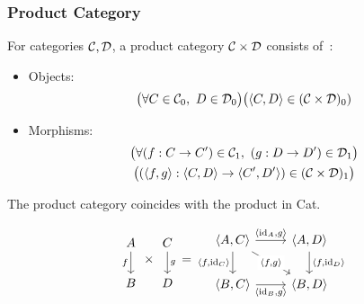 \subsubsection{Product Category}
\begin{definition}
  For categories $\mathcal{C},\mathcal{D}$, a product category $\mathcal{C}\times \mathcal{D}$ consists
  of~\parencite[p.~16]{awodey:category_theory}:

  \begin{itemize}
    \item Objects:
      \[\big(\forall C \in \mathcal{C}_0,\ D \in \mathcal{D}_0\big)
        \big(\langle C, D\rangle\in (\mathcal{C}\times \mathcal{D})_0)\]
    \item Morphisms:
      \[
        \begin{gathered}
          \big(\forall (f: C \to C')\in \mathcal{C}_1,\ (g:D \to D')\in \mathcal{D}_1\big)\\
          \big((\langle f,g\rangle : \langle C,D\rangle \to \langle C', D'\rangle)\in (\mathcal{C}\times \mathcal{D})_1\big)
        \end{gathered}
      \]
  \end{itemize}
\end{definition}

\begin{remark}
  The product category coincides with the product in Cat.
\end{remark}

\begin{example}
  \[
    \begin{tikzcd}[ampersand replacement=\&]
      A \\
      B
      \arrow["f"', from=1-1, to=2-1]
    \end{tikzcd}
    \times
    \begin{tikzcd}[ampersand replacement=\&]
      C \\
      D
      \arrow["g", from=1-1, to=2-1]
    \end{tikzcd}
    =
    \begin{tikzcd}[ampersand replacement=\&]
      {\langle A, C\rangle} \& {\langle A,D\rangle} \\
      {\langle B,C\rangle} \& {\langle B,D\rangle}
      \arrow["{\langle \id_A,g\rangle}", from=1-1, to=1-2]
      \arrow["{\langle f,\id_C\rangle}"', from=1-1, to=2-1]
      \arrow["{\langle \id_B,g\rangle}"', from=2-1, to=2-2]
      \arrow["{\langle f,\id_D\rangle}", from=1-2, to=2-2]
      \arrow["{\langle f,g\rangle}"{description}, from=1-1, to=2-2]
    \end{tikzcd}
  \]
\end{example}

